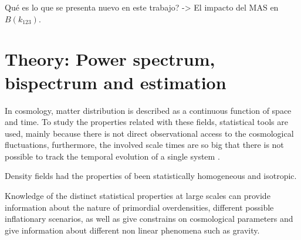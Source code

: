 \documentclass[a4paper,fleqn,usenatbib]{mnras}
\begin{document}
Qu\'e es lo que se presenta nuevo en este trabajo? -> El impacto del MAS en 
$B(k_123)$.

\section{Theory: Power spectrum, bispectrum and estimation} 
 \label{sec:theory}


In cosmology, matter distribution is described as a continuous function of 
space and time. To study the properties related with these fields, statistical 
tools are used, mainly because there is not direct observational access to the 
cosmological fluctuations, furthermore, the involved scale times are so big that 
there is not possible to track the temporal evolution of a single system 
\citep{Bernardeau2002,Martinez2002}.

Density fields had the properties of been statistically homogeneous and 
isotropic. 




Knowledge of the distinct statistical properties at large scales can provide  
information about the nature of primordial overdensities, different possible 
inflationary scenarios, as well as give constrains on cosmological parameters 
and give information about different non linear phenomena such as gravity.
\end{document}
